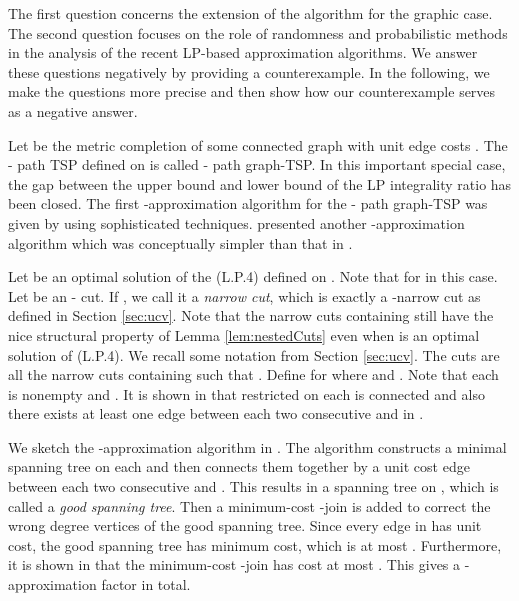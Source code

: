 \documentclass[11pt]{article}
\begin{document}
The first question concerns the extension of the algorithm for the graphic case. The second question focuses on the role of randomness and probabilistic methods in the analysis of the recent LP-based approximation algorithms. We answer these questions negatively by providing a counterexample.
In the following, we make the questions more precise and then show how our counterexample serves as a negative answer.


Let  be the metric completion of some connected graph  with unit edge costs .
The - path TSP defined on  is called - path graph-TSP. In this important special case,
the gap between the upper bound and lower bound of the LP integrality ratio has been closed. The first -approximation algorithm
for the - path graph-TSP was given by \cite{SV12} using sophisticated techniques. \cite{Gao13} presented another -approximation
algorithm which was conceptually simpler than that in \cite{SV12}.


Let  be an optimal solution of the (L.P.4) defined on . Note that  for  in this case.
Let  be an - cut. If , we call it a \emph{narrow cut}, which is exactly a -narrow
cut as defined in Section \ref{sec:ucv}. Note that the narrow cuts containing  still have the nice structural
property of Lemma \ref{lem:nestedCuts} even when  is an optimal solution of (L.P.4). We recall some notation
from Section \ref{sec:ucv}. The cuts  are all the narrow cuts containing  such that
. Define 
for  where  and . Note that each  is nonempty and .
It is shown in \cite{Gao13} that  restricted on each  is connected and also there exists at least one edge between each two
consecutive  and  in .

We sketch the -approximation algorithm in \cite{Gao13}. The algorithm constructs a minimal spanning tree on each  and then connects them together by a unit cost edge between each two consecutive  and . This results in a spanning tree on , which is called a \emph{good spanning tree}. Then a minimum-cost -join  is added to correct the wrong degree vertices of the good spanning tree. Since every edge in  has unit cost, the good spanning tree has minimum cost, which is at most . Furthermore, it is shown in \cite{Gao13} that the minimum-cost -join  has cost at most . This gives a -approximation factor in total.
\end{document}
